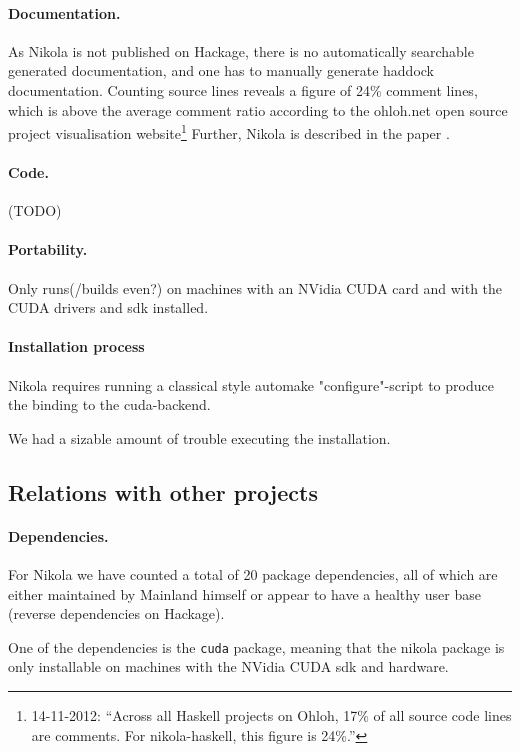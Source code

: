 \paragraph{Documentation.} As Nikola is not published on Hackage, there is no
automatically searchable generated documentation, and one has to manually
generate haddock documentation. Counting source lines reveals a figure of 24\%
comment lines, which is above the average comment ratio according to the
ohloh.net open source project visualisation website\footnote{14-11-2012:
``Across all Haskell projects on Ohloh, 17\% of all source code lines are
comments. For nikola-haskell, this figure is 24\%.''} Further, Nikola is
described in the paper \cite{mainland10nikola}.

\paragraph{Code.} (TODO)

\paragraph{Portability.} Only runs(/builds even?) on machines with an NVidia
CUDA card and with the CUDA drivers and sdk installed.

\paragraph{Installation process} Nikola requires running a classical style
automake "configure"-script to produce the binding to the cuda-backend.

We had a sizable amount of trouble executing the installation. 

\subsection{Relations with other projects}

\paragraph{Dependencies.} For Nikola we have counted a total of 20 package
dependencies, all of which are either maintained by Mainland himself or appear
to have a healthy user base (reverse dependencies on Hackage).

One of the dependencies is the \texttt{cuda} package, meaning that the nikola
package is only installable on machines with the NVidia CUDA sdk and hardware.

